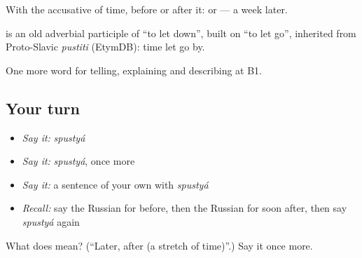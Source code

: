 With the accusative of time, before or after it: \emph{ } or \emph{ } — a week later.

\begin{cousinweb}
\emph{} is an old adverbial participle of \emph{} \textquotedblleft{}to let down\textquotedblright{}, built on \emph{} \textquotedblleft{}to let go\textquotedblright{}, inherited from Proto-Slavic \emph{pustiti} (EtymDB): time let go by.
\end{cousinweb}

\begin{grammarlens}[title={What you've built}]
One more word for telling, explaining and describing at B1.
\end{grammarlens}

\subsection*{Your turn}
\begin{itemize}
\raggedright
  \item \emph{Say it:} \emph{spustyá}
  \item \emph{Say it:} \emph{spustyá}, once more
  \item \emph{Say it:} a sentence of your own with \emph{spustyá}
  \item \emph{Recall:} say the Russian for before, then the Russian for soon after, then say \emph{spustyá} again
\end{itemize}

\begin{tcolorbox}[breakable,colback=teal!4,colframe=teal!35!black,title={Before you move on}]
What does  mean? (\textquotedblleft{}Later, after (a stretch of time)\textquotedblright{}.) Say it once more.
\end{tcolorbox}
